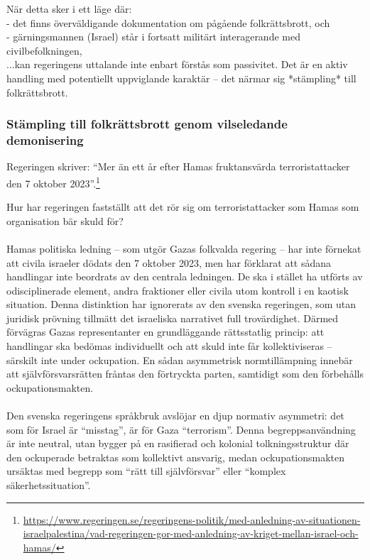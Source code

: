 När detta sker i ett läge där:\\
- det finns överväldigande dokumentation om pågående folkrättsbrott, och\\
- gärningsmannen (Israel) står i fortsatt militärt interagerande med civilbefolkningen,\\

...kan regeringens uttalande inte enbart förstås som passivitet. 
Det är en aktiv handling med potentiellt uppviglande karaktär – det närmar sig *stämpling* till folkrättsbrott.

\subsubsection{Stämpling till folkrättsbrott genom vilseledande demonisering}

Regeringen skriver: \enquote{Mer än ett år efter Hamas fruktansvärda terroristattacker den 7 oktober 2023}.\footnote{\url{https://www.regeringen.se/regeringens-politik/med-anledning-av-situationen-israelpalestina/vad-regeringen-gor-med-anledning-av-kriget-mellan-israel-och-hamas/}}

Hur har regeringen fastställt att det rör sig om terroristattacker som Hamas som organisation bär skuld för?

\paragraph{}
Hamas politiska ledning – som utgör Gazas folkvalda regering – har inte förnekat att civila israeler dödats den 7 oktober 2023, men har förklarat att sådana handlingar inte beordrats av den centrala ledningen. De ska i stället ha utförts av odisciplinerade element, andra fraktioner eller civila utom kontroll i en kaotisk situation. Denna distinktion har ignorerats av den svenska regeringen, som utan juridisk prövning tillmätt det israeliska narrativet full trovärdighet. Därmed förvägras Gazas representanter en grundläggande rättsstatlig princip: att handlingar ska bedömas individuellt och att skuld inte får kollektiviseras – särskilt inte under ockupation. En sådan asymmetrisk normtillämpning innebär att självförsvarsrätten fråntas den förtryckta parten, samtidigt som den förbehålls ockupationsmakten.

\paragraph{}
Den svenska regeringens språkbruk avslöjar en djup normativ asymmetri: det som för Israel är \enquote{misstag}, är för Gaza \enquote{terrorism}. Denna begreppsanvändning är inte neutral, utan bygger på en rasifierad och kolonial tolkningsstruktur där den ockuperade betraktas som kollektivt ansvarig, medan ockupationsmakten ursäktas med begrepp som \enquote{rätt till självförsvar} eller \enquote{komplex säkerhetssituation}.

